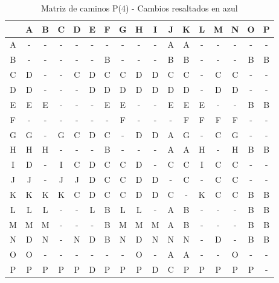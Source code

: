 \documentclass[12pt]{article}
\begin{document}
\begin{table}[h!]
\centering
\begin{tabular}{|c|c|c|c|c|c|c|c|c|c|c|c|c|c|c|c|c|}
\hline
 & A & B & C & D & E & F & G & H & I & J & K & L & M & N & O & P \\\hline
A & - & - & - & - & - & - & - & - & - & A & A & - & - & - & - & - \\\hline
B & - & - & - & - & - & B & - & - & - & B & B & - & - & - & B & B \\\hline
C & \cellcolor{lightblue} D & - & - & C & \cellcolor{lightblue} D & C & C & \cellcolor{lightblue} D & \cellcolor{lightblue} D & C & C & - & C & C & - & - \\\hline
D & D & - & - & - & D & D & D & D & D & D & D & - & D & D & - & - \\\hline
E & E & E & - & - & - & E & E & - & - & E & E & E & - & - & B & B \\\hline
F & - & - & - & - & - & - & F & - & - & - & F & F & F & F & - & - \\\hline
G & G & - & G & C & \cellcolor{lightblue} D & C & - & \cellcolor{lightblue} D & \cellcolor{lightblue} D & A & G & - & C & G & - & - \\\hline
H & H & H & - & - & - & B & - & - & - & A & A & H & - & H & B & B \\\hline
I & \cellcolor{lightblue} D & - & I & C & \cellcolor{lightblue} D & C & C & \cellcolor{lightblue} D & - & C & C & I & C & C & - & - \\\hline
J & J & - & J & J & \cellcolor{lightblue} D & C & C & \cellcolor{lightblue} D & \cellcolor{lightblue} D & - & C & - & C & C & - & - \\\hline
K & K & K & K & C & \cellcolor{lightblue} D & C & C & \cellcolor{lightblue} D & \cellcolor{lightblue} D & C & - & K & C & C & B & B \\\hline
L & L & L & - & - & L & B & L & L & - & A & B & - & - & - & B & B \\\hline
M & M & M & - & - & - & B & M & M & M & A & B & - & - & - & B & B \\\hline
N & \cellcolor{lightblue} D & N & - & N & \cellcolor{lightblue} D & B & N & \cellcolor{lightblue} D & N & N & N & - & \cellcolor{lightblue} D & - & B & B \\\hline
O & O & - & - & - & - & - & - & O & - & A & A & - & - & O & - & - \\\hline
P & P & P & P & P & \cellcolor{lightblue} D & P & P & P & \cellcolor{lightblue} D & C & P & P & P & P & P & - \\\hline
\end{tabular}
\caption{Matriz de caminos P(4) - Cambios resaltados en azul}
\end{table}
\end{document}
